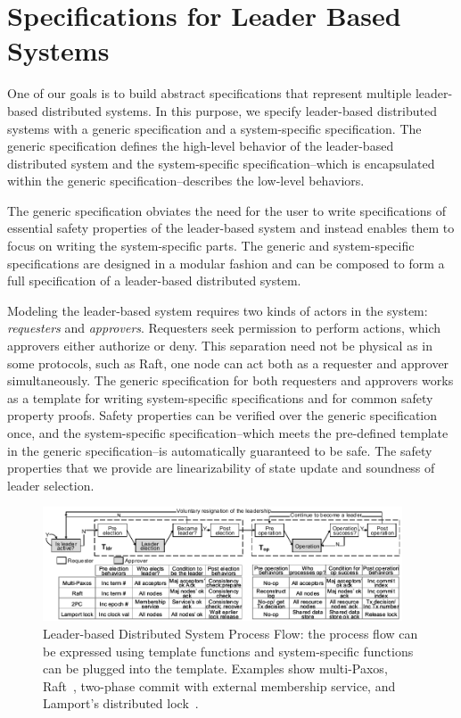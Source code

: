 
\section{Specifications for Leader Based Systems}
\label{chapter:witnesspassing:sec:specs-for-leader-based-system}

One of our goals is to build abstract specifications that represent multiple leader-based distributed systems.
In this purpose, we specify leader-based distributed systems with a generic
specification and a system-specific specification. 
The generic specification defines the high-level behavior of the leader-based 
distributed system and the system-specific specification--which is encapsulated within the generic specification--describes the low-level behaviors. 

The generic specification obviates the need for the user to write specifications
of essential safety properties of the leader-based system and instead enables them to
focus on writing the system-specific parts. The
generic and system-specific specifications are designed in a modular fashion and
can be composed to form a full specification of a leader-based distributed system.

Modeling the leader-based system requires two kinds of actors in the system:
\textit{requesters} and \textit{approvers}. 
Requesters seek permission to perform actions, which approvers either authorize or deny.
This separation need not be physical as in some protocols, such as Raft, one node can act
both as a requester and approver simultaneously.
The generic specification for both requesters and approvers 
works as a template for writing system-specific
specifications and for common safety property proofs.
Safety properties can be verified over the generic specification once,
and the system-specific specification--which meets the pre-defined template in the generic specification--is automatically guaranteed to be safe. The safety
properties that we provide are linearizability of state update and
soundness of leader selection.


\begin{figure}
\includegraphics[width=0.95\textwidth]{figs/witnesspassing/overviewfig}
\caption{Leader-based Distributed System Process Flow: the process flow can be
	expressed using template functions and system-specific functions can
	be plugged into the template. Examples show multi-Paxos, 
	Raft~\cite{raft}, two-phase commit with external membership service, 
	and Lamport's distributed lock~\cite{lamportclock}.}
\label{fig:chapter:witnesspassing:process-flow}
\end{figure}

